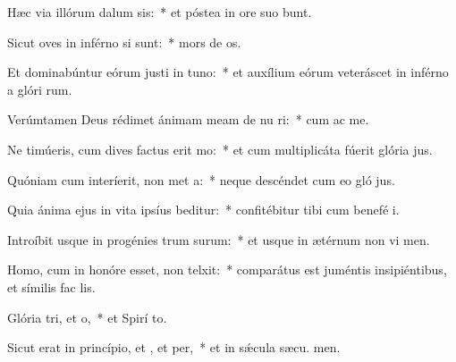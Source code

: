 \item Hæc via illórum dalum sis:~* et póstea in ore suo bunt.
\item Sicut oves in inférno si sunt:~* mors de os.
\item Et dominabúntur eórum justi in tuno:~* et auxílium eórum veteráscet in inférno a glóri rum.
\item Verúmtamen Deus rédimet ánimam meam de nu ri:~* cum ac me.
\item Ne timúeris, cum dives factus erit mo:~* et cum multiplicáta fúerit glória  jus.
\item Quóniam cum interíerit, non met a:~* neque descéndet cum eo gló jus.
\item Quia ánima ejus in vita ipsíus beditur:~* confitébitur tibi cum benefé i.
\item Introíbit usque in progénies trum surum:~* et usque in ætérnum non vi men.
\item Homo, cum in honóre esset, non telxit:~* comparátus est juméntis insipiéntibus, et símilis fac  lis.
\item Glória tri, et o,~* et Spirí to.
\item Sicut erat in princípio, et , et per,~* et in sǽcula sæcu. men.
